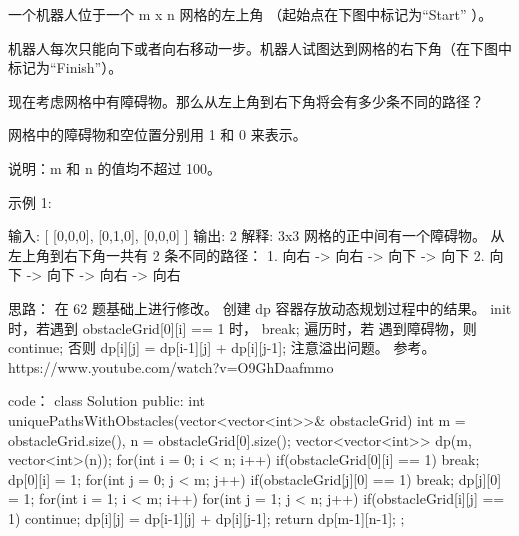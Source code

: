 一个机器人位于一个 m x n 网格的左上角 （起始点在下图中标记为“Start” ）。

机器人每次只能向下或者向右移动一步。机器人试图达到网格的右下角（在下图中标记为“Finish”）。

现在考虑网格中有障碍物。那么从左上角到右下角将会有多少条不同的路径？

网格中的障碍物和空位置分别用 1 和 0 来表示。

说明：m 和 n 的值均不超过 100。

示例 1:

输入:
[
  [0,0,0],
  [0,1,0],
  [0,0,0]
]
输出: 2
解释:
3x3 网格的正中间有一个障碍物。
从左上角到右下角一共有 2 条不同的路径：
1. 向右 -> 向右 -> 向下 -> 向下
2. 向下 -> 向下 -> 向右 -> 向右



























思路：
在 62 题基础上进行修改。
创建 dp 容器存放动态规划过程中的结果。
init 时，若遇到 obstacleGrid[0][i] == 1 时， break;
遍历时，若 遇到障碍物，则continue; 否则 dp[i][j] = dp[i-1][j] + dp[i][j-1];
注意溢出问题。
参考。 https://www.youtube.com/watch?v=O9GhDaafmmo






























code：
class Solution {
public:
    int uniquePathsWithObstacles(vector<vector<int>>& obstacleGrid) {
        int m = obstacleGrid.size(), n = obstacleGrid[0].size();
        vector<vector<int>> dp(m, vector<int>(n));
        for(int i = 0; i < n; i++)
        {
            if(obstacleGrid[0][i] == 1) break;
            dp[0][i] = 1;
        }
        for(int j = 0; j < m; j++)
        {
            if(obstacleGrid[j][0] == 1) break;
            dp[j][0] = 1;
        }
        for(int i = 1; i < m; i++)
        {
            for(int j = 1; j < n; j++)
            {
                if(obstacleGrid[i][j] == 1) continue;
                dp[i][j] = dp[i-1][j] + dp[i][j-1];
            }
        }
        return dp[m-1][n-1];
    }
};